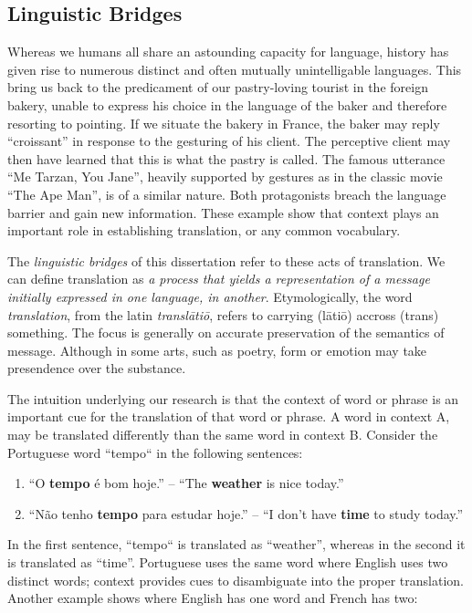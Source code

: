 \subsection{Linguistic Bridges}

Whereas we humans all share an astounding capacity for language, history has
given rise to numerous distinct and often mutually unintelligable languages.
This bring us back to the predicament of our pastry-loving tourist in the
foreign bakery, unable to express his choice in the language of the baker and
therefore resorting to pointing. If we situate the bakery in France, the baker
may reply ``croissant'' in response to the gesturing of his client. The
perceptive client may then have learned that this is what the pastry is called.
The famous utterance ``Me Tarzan, You Jane'', heavily supported by gestures as in
the classic movie ``The Ape Man'', is of a similar nature. Both protagonists
breach the language barrier and gain new information. These example show that context
plays an important role in establishing translation, or any common vocabulary. 

The \emph{linguistic bridges} of this dissertation refer to these acts of
translation. We can define translation as \emph{a process that yields a
representation of a message initially expressed in one language, in another}.
Etymologically, the word \emph{translation}, from the latin \emph{transl\=ati\=o},
refers to carrying (l\=ati\=o) accross (trans) something. The focus is generally on
accurate preservation of the semantics of message.  Although in some arts, such
as poetry, form or emotion may take presendence over the substance.

The intuition underlying our research is that the context of word or phrase is
an important cue for the translation of that word or phrase. A word in context
A, may be translated differently than the same word in context B. Consider the
Portuguese word ``tempo`` in the following sentences:

\begin{enumerate}
\item ``O \textbf{tempo} é bom hoje.'' -- ``The \textbf{weather} is nice today.''
\item ``Não tenho \textbf{tempo} para estudar hoje.'' -- ``I don't have \textbf{time} to study today.''
\end{enumerate}

In the first sentence, ``tempo`` is translated as ``weather'', whereas in the
second it is translated as ``time''. Portuguese uses the same word where
English uses two distinct words; context provides cues to disambiguate into the
proper translation. Another example shows where English has one word and French has two:

